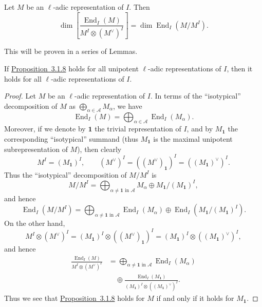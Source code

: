 Let \(M\) be an \(\ell\)-adic representation of \(I\). Then
\[
  \dim\left[
  \frac{\operatorname{End}_I(M)}
       {M^I\otimes(M^{\vee})^I}
  \right]
  =
  \dim\operatorname{End}_I(M/M^I).
\]

This will be proven in a series of Lemmas.

If \hyperref[prop:3.1.8]{Proposition~3.1.8} holds for all unipotent
\(\ell\)-adic representations of \(I\), then it holds for all
\(\ell\)-adic representations of \(I\).

\begin{proof}
Let \(M\) be an \(\ell\)-adic representation of \(I\). In terms of the
``isotypical'' decomposition of \(M\) as
\(\bigoplus_{\alpha\in\mathcal{A}}M_\alpha\), we have
\[
  \operatorname{End}_I(M)=
  \bigoplus_{\alpha\in\mathcal{A}}\operatorname{End}_I(M_\alpha).
\]
Moreover, if we denote by \(\mathbf{1}\) the trivial representation of \(I\),
and by \(M_{\mathbf{1}}\) the corresponding ``isotypical'' summand (thus
\(M_{\mathbf{1}}\) is the maximal unipotent subrepresentation of \(M\)), then
clearly
\[
  M^I=(M_{\mathbf{1}})^I,\qquad
  (M^{\vee})^I=((M^{\vee})_{\mathbf{1}})^I
  =((M_{\mathbf{1}})^{\vee})^I.
\]
Thus the ``isotypical'' decomposition of \(M/M^I\) is
\[
  M/M^I
  =
  \bigoplus_{\alpha\ne\mathbf{1}\text{ in }\mathcal{A}}M_\alpha
  \oplus M_{\mathbf{1}}/(M_{\mathbf{1}})^I,
\]
and hence
\[
  \operatorname{End}_I(M/M^I)
  =
  \bigoplus_{\alpha\ne\mathbf{1}\text{ in }\mathcal{A}}\operatorname{End}_I(M_\alpha)
  \oplus
  \operatorname{End}_I(M_{\mathbf{1}}/(M_{\mathbf{1}})^I).
\]
On the other hand,
\[
  M^I\otimes(M^{\vee})^I
  =
  (M_{\mathbf{1}})^I\otimes((M^{\vee})_{\mathbf{1}})^I
  =
  (M_{\mathbf{1}})^I\otimes((M_{\mathbf{1}})^{\vee})^I,
\]
and hence
\[
\begin{aligned}
  \frac{\operatorname{End}_I(M)}{M^I\otimes(M^{\vee})^I}
  &=
  \bigoplus_{\alpha\ne\mathbf{1}\text{ in }\mathcal{A}}
  \operatorname{End}_I(M_\alpha)\\
  &\quad\oplus
  \frac{\operatorname{End}_I(M_{\mathbf{1}})}
       {(M_{\mathbf{1}})^I\otimes((M_{\mathbf{1}})^{\vee})^I}.
\end{aligned}
\]
Thus we see that \hyperref[prop:3.1.8]{Proposition~3.1.8} holds for \(M\) if
and only if it holds for \(M_{\mathbf{1}}\).
\end{proof}

